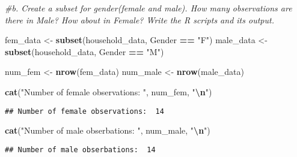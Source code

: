 \documentclass[
]{article}
\newenvironment{Shaded}{\begin{snugshade}}{\end{snugshade}}
\newcommand{\AttributeTok}[1]{\textcolor[rgb]{0.13,0.29,0.53}{#1}}
\newcommand{\CommentTok}[1]{\textcolor[rgb]{0.56,0.35,0.01}{\textit{#1}}}
\newcommand{\FunctionTok}[1]{\textcolor[rgb]{0.13,0.29,0.53}{\textbf{#1}}}
\newcommand{\NormalTok}[1]{#1}
\newcommand{\OtherTok}[1]{\textcolor[rgb]{0.56,0.35,0.01}{#1}}
\newcommand{\SpecialCharTok}[1]{\textcolor[rgb]{0.81,0.36,0.00}{\textbf{#1}}}
\newcommand{\StringTok}[1]{\textcolor[rgb]{0.31,0.60,0.02}{#1}}
\begin{document}
\begin{Shaded}
\begin{Highlighting}[]
\CommentTok{\#b. Create a subset for gender(female and male). How many observations are there in Male? How about in Female? Write the R scripts and its output.}

\NormalTok{fem\_data }\OtherTok{\textless{}{-}} \FunctionTok{subset}\NormalTok{(household\_data, Gender }\SpecialCharTok{==} \StringTok{"F"}\NormalTok{)}
\NormalTok{male\_data }\OtherTok{\textless{}{-}} \FunctionTok{subset}\NormalTok{(household\_data, Gender }\SpecialCharTok{==} \StringTok{"M"}\NormalTok{)}

\NormalTok{num\_fem }\OtherTok{\textless{}{-}} \FunctionTok{nrow}\NormalTok{(fem\_data)}
\NormalTok{num\_male }\OtherTok{\textless{}{-}} \FunctionTok{nrow}\NormalTok{(male\_data)}

\FunctionTok{cat}\NormalTok{(}\StringTok{"Number of female observations: "}\NormalTok{, num\_fem, }\StringTok{"}\SpecialCharTok{\textbackslash{}n}\StringTok{"}\NormalTok{)}
\end{Highlighting}
\end{Shaded}

\begin{verbatim}
## Number of female observations:  14
\end{verbatim}

\begin{Shaded}
\begin{Highlighting}[]
\FunctionTok{cat}\NormalTok{(}\StringTok{"Number of male obserbations: "}\NormalTok{,  num\_male, }\StringTok{"}\SpecialCharTok{\textbackslash{}n}\StringTok{"}\NormalTok{)}
\end{Highlighting}
\end{Shaded}

\begin{verbatim}
## Number of male obserbations:  14
\end{verbatim}

\begin{Shaded}
\end{Shaded}
\end{document}
